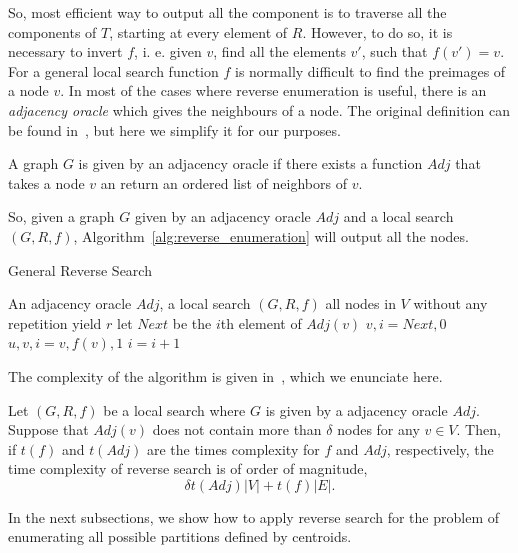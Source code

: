 \documentclass{article}
\begin{document}
So, most efficient way to output all the component is to traverse all
the components of $T$, starting at every element of $R$. 
However, to do so, it is necessary to invert $f$, i. e. 
given $v$, find all the elements $v'$, such that $f(v')=v$. For a
general local search function $f$ is normally difficult to find 
the preimages of a node $v$. In most of the cases where reverse
enumeration is useful, there is an 
\textit{adjacency oracle} which gives the neighbours of a node. The
original definition can be found in~\cite{AvisFukuda}, but here we
simplify it for our purposes. 
\begin{definition}
  A graph $G$ is given by an  adjacency oracle if there exists  a
  function $Adj$ that takes a node $v$ an return an ordered list of
  neighbors of $v$.
\end{definition}
So, given a graph $G$ given by an adjacency oracle $Adj$ and a local
search $(G,R,f)$, Algorithm~\ref{alg:reverse_enumeration} will output
all the nodes. 
\begin{algorithm}
  \caption{General Reverse Search}
  \label{alg:reverse_enumeration}
  \begin{algorithmic}
    \REQUIRE An adjacency oracle $Adj$, a local search $(G,R,f)$
    \ENSURE all nodes in $V$ without any repetition
    \STATE yield $r$
    \STATE let $Next$ be the $i$th element of $Adj(v)$
    \STATE $v, i = Next, 0$
    \ELSE
    \ENDIF
    \ENDWHILE
    \ELSE
    \STATE $u, v, i  = v, f(v), 1$
    \STATE $i = i +1$
    \ENDWHILE
    \ENDIF
    \ENDWHILE
    \ENDFOR
  \end{algorithmic}
\end{algorithm}
The complexity of the algorithm is given in~\cite[Theorem
2.2]{AvisFukuda}, which we enunciate here.
\begin{theorem}
\label{thm:complexity}
  Let   $(G, R, f)$ be a local search where  $G$ is
  given by a adjacency oracle $Adj$. Suppose that  $Adj(v)$ does not
  contain more than $\delta$ nodes for any $v\in V$. Then, if $t(f)$
  and $t(Adj)$ are the times complexity for $f$ and $Adj$,
  respectively, the time complexity of reverse search is of order of
  magnitude, 
  \begin{equation*}
    \delta t(Adj)|V| + t(f)|E|.
  \end{equation*}
\end{theorem}
In the next subsections, we show how to apply reverse search for the
problem of enumerating all possible partitions defined by centroids.
\end{document}
